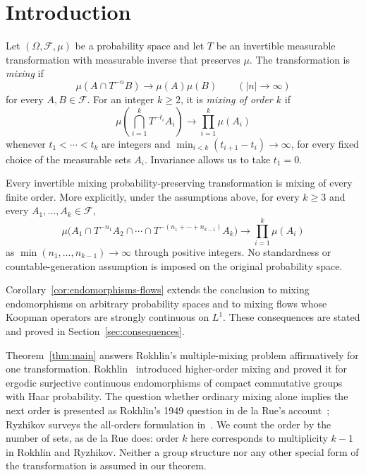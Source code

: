 \section{Introduction}
\label{sec:introduction}

Let $(\Omega,\mathcal F,\mu)$ be a probability space and let $T$ be an
invertible measurable transformation with measurable inverse that preserves
$\mu$. The transformation is \emph{mixing} if
\[
 \mu(A\cap T^{-n}B)\longrightarrow\mu(A)\mu(B)
 \qquad(|n|\to\infty)
\]
for every $A,B\in\mathcal F$. For an integer $k\ge2$, it is
\emph{mixing of order $k$} if
\[
 \mu\left(\bigcap_{i=1}^k T^{-t_i}A_i\right)
 \longrightarrow\prod_{i=1}^k\mu(A_i)
\]
whenever $t_1<\cdots<t_k$ are integers and
$\min_{i<k}(t_{i+1}-t_i)\to\infty$, for every fixed choice of the
measurable sets $A_i$. Invariance allows us to take $t_1=0$.

\begin{theorem}
\label{thm:main}
Every invertible mixing probability-preserving transformation is mixing
of every finite order. More explicitly, under the assumptions above, for
every $k\ge3$ and every $A_1,\ldots,A_k\in\mathcal F$,
\[
 \mu\bigl(A_1\cap T^{-n_1}A_2\cap\cdots\cap
             T^{-(n_1+\cdots+n_{k-1})}A_k\bigr)
 \longrightarrow\prod_{i=1}^k\mu(A_i)
\]
as $\min(n_1,\ldots,n_{k-1})\to\infty$ through positive integers.
No standardness or countable-generation assumption is imposed on the
original probability space.
\end{theorem}

Corollary~\ref{cor:endomorphisms-flows} extends the conclusion to mixing
endomorphisms on arbitrary probability spaces and to mixing flows whose
Koopman operators are strongly continuous on $L^1$. These consequences
are stated and proved in Section~\ref{sec:consequences}.

Theorem~\ref{thm:main} answers Rokhlin's multiple-mixing problem
affirmatively for one transformation. Rokhlin~\cite{Rokhlin1949}
introduced higher-order mixing and proved it for ergodic surjective
continuous endomorphisms of compact commutative groups with Haar
probability. The question whether ordinary mixing alone implies the next
order is presented as Rokhlin's 1949 question in de la Rue's
account~\cite[Section~1.1]{deLaRue2006}; Ryzhikov surveys the all-orders
formulation in~\cite[Section~1]{Ryzhikov2024}. We count the order by the
number of sets, as de la Rue does: order $k$ here corresponds to
multiplicity $k-1$ in Rokhlin and Ryzhikov. Neither a group structure nor
any other special form of the transformation is assumed in our theorem.

